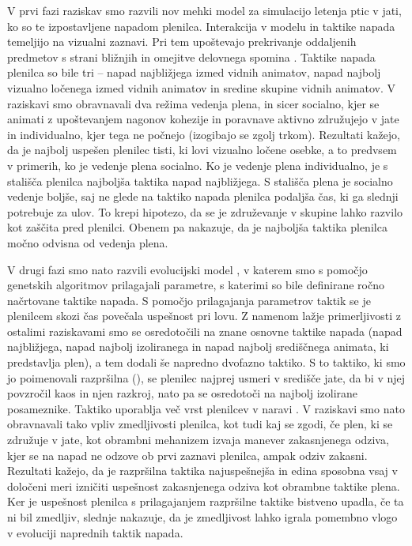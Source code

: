 \begin{razsirjeniPovzetek}
V prvi fazi raziskav smo razvili nov mehki model \cite{demsar2014simulated} za simulacijo letenja ptic v jati, ko so te izpostavljene napadom plenilca. Interakcija v modelu in taktike napada temeljijo na vizualni zaznavi. Pri tem upoštevajo prekrivanje oddaljenih predmetov s strani bližnjih \cite{kunz2012simulations} in omejitve delovnega spomina \cite{ballerini2008interaction,engle1999individual,sherry1989hippocampus}. Taktike napada plenilca so bile tri -- napad najbližjega izmed vidnih animatov, napad najbolj vizualno ločenega izmed vidnih animatov in sredine skupine vidnih animatov. V raziskavi smo obravnavali dva režima vedenja plena, in sicer socialno, kjer se animati z upoštevanjem nagonov kohezije in poravnave aktivno združujejo v jate in individualno, kjer tega ne počnejo (izogibajo se zgolj trkom). Rezultati kažejo, da je najbolj uspešen plenilec tisti, ki lovi vizualno ločene osebke, a to predvsem v primerih, ko je vedenje plena socialno. Ko je vedenje plena individualno, je s stališča plenilca najboljša taktika napad najbližjega. S stališča plena je socialno vedenje boljše, saj ne glede na taktiko napada plenilca podaljša čas, ki ga slednji potrebuje za ulov. To krepi hipotezo, da se je združevanje v skupine lahko razvilo kot zaščita pred plenilci. Obenem pa nakazuje, da je najboljša taktika plenilca močno odvisna od vedenja plena.

V drugi fazi smo nato razvili evolucijski model \cite{demsar2015simulating}, v katerem smo s pomočjo genetskih algoritmov prilagajali parametre, s katerimi so bile definirane ročno načrtovane taktike napada. S pomočjo prilagajanja parametrov taktik se je plenilcem skozi čas povečala uspešnost pri lovu. Z namenom lažje primerljivosti z ostalimi raziskavami smo se osredotočili na znane osnovne taktike napada (napad najbližjega, napad najbolj izoliranega in napad najbolj središčnega animata, ki predstavlja plen), a tem dodali še napredno dvofazno taktiko. S to taktiko, ki smo jo poimenovali razpršilna (), se plenilec najprej usmeri v središče jate, da bi v njej povzročil kaos in njen razkroj, nato pa se osredotoči na najbolj izolirane posameznike. Taktiko uporablja več vrst plenilcev v naravi \cite{larsson2012why,pavlov2000patterns}. V raziskavi smo nato obravnavali tako vpliv zmedljivosti plenilca, kot tudi kaj se zgodi, če plen, ki se združuje v jate, kot obrambni mehanizem izvaja manever zakasnjenega odziva, kjer se na napad ne odzove ob prvi zaznavi plenilca, ampak odziv zakasni. Rezultati kažejo, da je razpršilna taktika najuspešnejša in edina sposobna vsaj v določeni meri izničiti uspešnost zakasnjenega odziva kot obrambne taktike plena. Ker je uspešnost plenilca s prilagajanjem razpršilne taktike bistveno upadla, če ta ni bil zmedljiv, slednje nakazuje, da je zmedljivost lahko igrala pomembno vlogo v evoluciji naprednih taktik napada.


\end{razsirjeniPovzetek}
